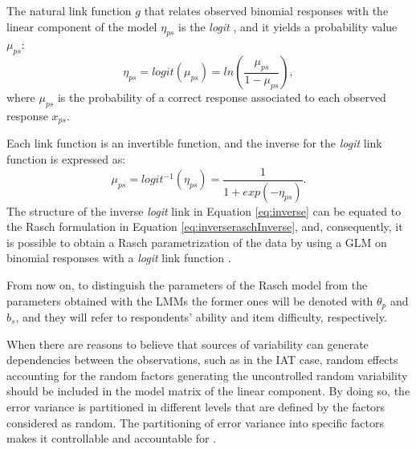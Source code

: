 \documentclass[12pt]{book}
\begin{document}
The natural link function $g$ that relates observed binomial responses with the linear component of the model $\eta_{ps}$ is the \emph{logit} \cite<the logarithm of the odds,>{mc1989}, and it yields a probability value $\mu_{ps}$:
 	\begin{equation}\label{eq:logit}
 		\eta_{ps} = logit(\mu_{ps}) = ln\left( \frac{\mu_{ps}}{1 - \mu_{ps}}\right),
 	\end{equation}
where $\mu_{ps}$ is the probability of a correct response associated to each observed response $x_{ps}$.

Each link function is an invertible function, and the inverse for the \emph{logit} link function is expressed as:
\begin{equation}\label{eq:inverse}
	\mu_{ps} = logit^{-1}(\eta_{ps}) = \frac{1}{1 + exp(-\eta_{ps})}.
\end{equation}
The structure of the inverse \emph{logit} link in Equation \ref{eq:inverse} can be equated to the Rasch formulation in Equation \ref{eq:inverseraschInverse}, and, consequently, it is possible to obtain a Rasch parametrization of the data by using a GLM on binomial responses with a \emph{logit} link function \cite{DeBoeck2011, Doran2007, Gelman2007}. 

From now on, to distinguish the parameters of the Rasch model from the parameters obtained with the LMMs the former ones will be denoted with $\theta_p$ and $b_s$, and they will refer to respondents' ability and item difficulty, respectively.


When there are reasons to believe that sources of variability can generate dependencies between the observations, such as in the IAT case, random effects accounting for the random factors generating the uncontrolled  random variability should be included in the model matrix of the linear component. 
By doing so, the error variance is partitioned in different levels that are defined by the factors considered as random. 
The partitioning of error variance into specific factors makes it controllable and accountable for \cite{Doran2007}.
\end{document}
